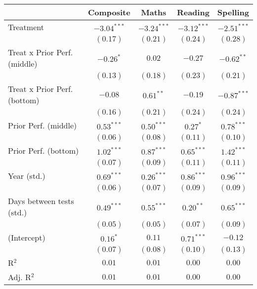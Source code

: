 
\begin{table}
\begin{center}
\begin{tabular}{l c c c c}
\hline
 & Composite & Maths & Reading & Spelling \\
\hline
Treatment                    & $-3.04^{***}$ & $-3.24^{***}$ & $-3.12^{***}$ & $-2.51^{***}$ \\
                             & $(0.17)$      & $(0.21)$      & $(0.24)$      & $(0.28)$      \\
Treat x Prior Perf. (middle) & $-0.26^{*}$   & $0.02$        & $-0.27$       & $-0.62^{**}$  \\
                             & $(0.13)$      & $(0.18)$      & $(0.23)$      & $(0.21)$      \\
Treat x Prior Perf. (bottom) & $-0.08$       & $0.61^{**}$   & $-0.19$       & $-0.87^{***}$ \\
                             & $(0.16)$      & $(0.21)$      & $(0.24)$      & $(0.24)$      \\
Prior Perf. (middle)         & $0.53^{***}$  & $0.50^{***}$  & $0.27^{*}$    & $0.78^{***}$  \\
                             & $(0.06)$      & $(0.08)$      & $(0.11)$      & $(0.10)$      \\
Prior Perf. (bottom)         & $1.02^{***}$  & $0.87^{***}$  & $0.65^{***}$  & $1.42^{***}$  \\
                             & $(0.07)$      & $(0.09)$      & $(0.11)$      & $(0.11)$      \\
Year (std.)                  & $0.69^{***}$  & $0.26^{***}$  & $0.86^{***}$  & $0.96^{***}$  \\
                             & $(0.06)$      & $(0.07)$      & $(0.09)$      & $(0.09)$      \\
Days between tests (std.)    & $0.49^{***}$  & $0.55^{***}$  & $0.20^{**}$   & $0.65^{***}$  \\
                             & $(0.05)$      & $(0.05)$      & $(0.07)$      & $(0.09)$      \\
(Intercept)                  & $0.16^{*}$    & $0.11$        & $0.71^{***}$  & $-0.12$       \\
                             & $(0.07)$      & $(0.08)$      & $(0.10)$      & $(0.13)$      \\
\hline
R$^2$                        & $0.01$        & $0.01$        & $0.00$        & $0.00$        \\
Adj. R$^2$                   & $0.01$        & $0.01$        & $0.00$        & $0.00$        \\

\end{tabular}
\end{center}
\end{table}
